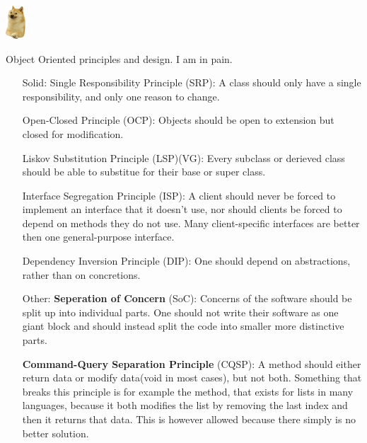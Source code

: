\documentclass{article}
\begin{document}
\includegraphics[width=2em]{2ljhyisqtna51.png}\newline
\begin{center}
    \vspace*{\fill}
    {\Huge Object Oriented principles and design.}\newline
    {\small I am in pain.}
    \vspace*{\fill}
\end{center}
\newpage

\begin{enumerate}
    \item[\huge{Solid:}]
          {\huge S}ingle Responsibility Principle (SRP):\newline
          A class should only have a single responsibility, and only one reason to change.

              {\huge O}pen-Closed Principle (OCP):\newline
          Objects should be open to extension but closed for modification.

              {\huge L}iskov Substitution Principle (LSP)(VG):\newline
          Every subclass or derieved class should be able to substitue
          for their base or super class.

              {\huge I}nterface Segregation Principle (ISP):\newline
          A client should never be forced to implement an interface that it doesn't use, nor
          should clients be forced to depend on methods they do not use. Many
          client-specific interfaces are better then one general-purpose interface.

              {\huge D}ependency Inversion Principle (DIP):\newline
          One should depend on abstractions, rather than on concretions.

    \item[\huge Other:]
          \textbf{Seperation of Concern} (SoC):\newline
          Concerns of the software should be split up into individual parts.
          One should not write their software as one giant block and should instead
          split the code into smaller more distinctive parts.

          \textbf{Command-Query Separation Principle} (CQSP):\newline
          A method should either return data or modify data(void in most cases),
          but not both.\newline
          Something that breaks this principle is for example the  method, that
          exists for lists in many languages, because it both modifies the list by removing
          the last index and then it returns that data. This is however allowed because there
          simply is no better solution.


\end{enumerate}
\end{document}
